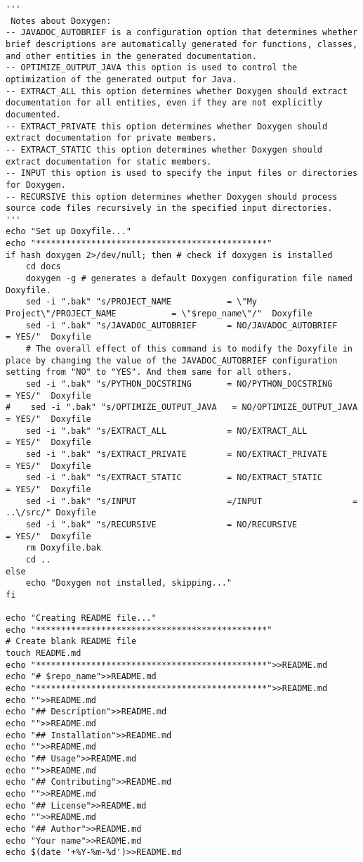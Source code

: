 \documentclass[12pt,a4paper]{article}
\begin{document}
\begin{lstlisting}
'''
 Notes about Doxygen:
-- JAVADOC_AUTOBRIEF is a configuration option that determines whether brief descriptions are automatically generated for functions, classes, and other entities in the generated documentation.
-- OPTIMIZE_OUTPUT_JAVA this option is used to control the optimization of the generated output for Java.
-- EXTRACT_ALL this option determines whether Doxygen should extract documentation for all entities, even if they are not explicitly documented.
-- EXTRACT_PRIVATE this option determines whether Doxygen should extract documentation for private members.
-- EXTRACT_STATIC this option determines whether Doxygen should extract documentation for static members.
-- INPUT this option is used to specify the input files or directories for Doxygen.
-- RECURSIVE this option determines whether Doxygen should process source code files recursively in the specified input directories.
'''
echo "Set up Doxyfile..."
echo "**********************************************"
if hash doxygen 2>/dev/null; then # check if doxygen is installed
    cd docs
    doxygen -g # generates a default Doxygen configuration file named Doxyfile.
    sed -i ".bak" "s/PROJECT_NAME           = \"My Project\"/PROJECT_NAME           = \"$repo_name\"/"  Doxyfile
    sed -i ".bak" "s/JAVADOC_AUTOBRIEF      = NO/JAVADOC_AUTOBRIEF      = YES/"  Doxyfile
    # The overall effect of this command is to modify the Doxyfile in place by changing the value of the JAVADOC_AUTOBRIEF configuration setting from "NO" to "YES". And them same for all others.
    sed -i ".bak" "s/PYTHON_DOCSTRING       = NO/PYTHON_DOCSTRING       = YES/"  Doxyfile
#    sed -i ".bak" "s/OPTIMIZE_OUTPUT_JAVA   = NO/OPTIMIZE_OUTPUT_JAVA   = YES/"  Doxyfile
    sed -i ".bak" "s/EXTRACT_ALL            = NO/EXTRACT_ALL            = YES/"  Doxyfile
    sed -i ".bak" "s/EXTRACT_PRIVATE        = NO/EXTRACT_PRIVATE        = YES/"  Doxyfile
    sed -i ".bak" "s/EXTRACT_STATIC         = NO/EXTRACT_STATIC         = YES/"  Doxyfile
    sed -i ".bak" "s/INPUT                  =/INPUT                  = ..\/src/" Doxyfile
    sed -i ".bak" "s/RECURSIVE              = NO/RECURSIVE              = YES/"  Doxyfile
    rm Doxyfile.bak
    cd ..
else
    echo "Doxygen not installed, skipping..."
fi

echo "Creating README file..."
echo "**********************************************"
# Create blank README file
touch README.md
echo "**********************************************">>README.md
echo "# $repo_name">>README.md
echo "**********************************************">>README.md
echo "">>README.md
echo "## Description">>README.md
echo "">>README.md
echo "## Installation">>README.md
echo "">>README.md
echo "## Usage">>README.md
echo "">>README.md
echo "## Contributing">>README.md
echo "">>README.md
echo "## License">>README.md
echo "">>README.md
echo "## Author">>README.md
echo "Your name">>README.md
echo $(date '+%Y-%m-%d')>>README.md



\end{lstlisting}
\end{document}
